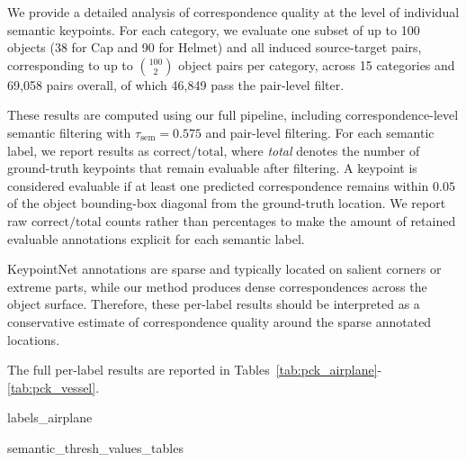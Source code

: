 We provide a detailed analysis of correspondence quality at the level of individual semantic keypoints. For each category, we evaluate one subset of up to 100 objects (38 for Cap and 90 for Helmet) and all
induced source-target pairs, corresponding to up to $\binom{100}{2}$ object pairs per category, across
15 categories and 69{,}058 pairs overall, of which 46{,}849 pass the pair-level filter.


These results are computed using our full pipeline, including correspondence-level semantic filtering with $\tau_{\mathrm{sem}}=0.575$ and pair-level filtering. For each semantic label, we report results as $\text{correct}/\text{total}$, where \emph{total} denotes the number of ground-truth keypoints that remain evaluable after filtering. A keypoint is considered evaluable if at least one predicted correspondence remains within $0.05$ of the object bounding-box diagonal from the ground-truth location. We report raw $\text{correct}/\text{total}$ counts rather than percentages to make the amount of retained evaluable annotations explicit for each semantic label.

KeypointNet annotations are sparse and typically located on salient corners or extreme parts, while our method produces dense correspondences across the object surface. Therefore, these per-label results should be interpreted as a conservative estimate of correspondence quality around the sparse annotated locations.

The full per-label results are reported in 
Tables~\ref{tab:pck_airplane}-\ref{tab:pck_vessel}.


{labels_airplane}

\clearpage
{semantic_thresh_values_tables}

